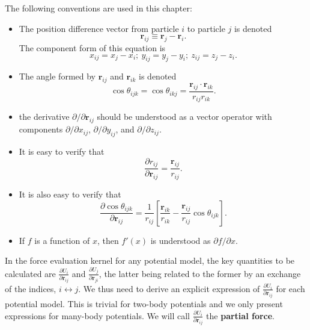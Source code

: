 \documentclass[12pt,a4paper]{report}
\newcommand{\vect}[1]{\boldsymbol{#1}}
\begin{document}
The following conventions are used in this chapter:
\begin{itemize}
\item The position difference vector from particle $i$ to particle $j$ is denoted
\begin{equation}
 \boxed{ \vect{r}_{ij} \equiv \vect{r}_j - \vect{r}_i } .
\end{equation}
The component form of this equation is
\begin{equation}
x_{ij} = x_j - x_i; ~y_{ij} = y_j - y_i; ~z_{ij} = z_j - z_i.
\end{equation}
\item The angle formed by $\vect{r}_{ij}$ and $\vect{r}_{ik}$ is denoted
\begin{equation}
\label{equation:cos_theta}
\boxed{\cos\theta_{ijk} = \cos\theta_{ikj} = \frac{\vect{r}_{ij} \cdot \vect{r}_{ik}}{r_{ij} r_{ik}}}.
\end{equation}
\item the derivative $\partial/\partial \vect{r}_{ij}$ should be understood as a vector operator with
components $\partial/\partial x_{ij}$, $\partial/\partial y_{ij}$, and $\partial/\partial z_{ij}$.
\item It is easy to verify that
\begin{equation}
\boxed{
\frac{\partial r_{ij}}{\partial \vect{r}_{ij}} = \frac{\vect{r}_{ij}}{r_{ij}}
}.
\end{equation}
\item It is also easy to verify that
\begin{equation}
\boxed{
\frac{\partial \cos\theta_{ijk}}{\partial \vect{r}_{ij}}
= \frac{1}{r_{ij}}\left[\frac{\vect{r}_{ik}}{r_{ik}}
- \frac{\vect{r}_{ij}}{r_{ij}} \cos\theta_{ijk}\right]
}.
\end{equation}
\item
If $f$ is a function of $x$, then $f'(x)$ is understood as $\partial f / \partial x$.
\end{itemize}

In the force evaluation kernel for any potential model, the key quantities to be calculated are $\frac{\partial U_{i}}{\partial \vect{r}_{ij}}$  and $\frac{\partial U_{j}}{\partial \vect{r}_{ji}}$, the latter being related to the former by an exchange of the indices, $i\leftrightarrow j$. We thus need to derive an explicit expression of $\frac{\partial U_{i}}{\partial \vect{r}_{ij}}$ for each potential model. This is trivial for two-body potentials and we only present expressions for many-body potentials. We will call $\frac{\partial U_{i}}{\partial \vect{r}_{ij}}$ the \textbf{partial force}.
\end{document}
